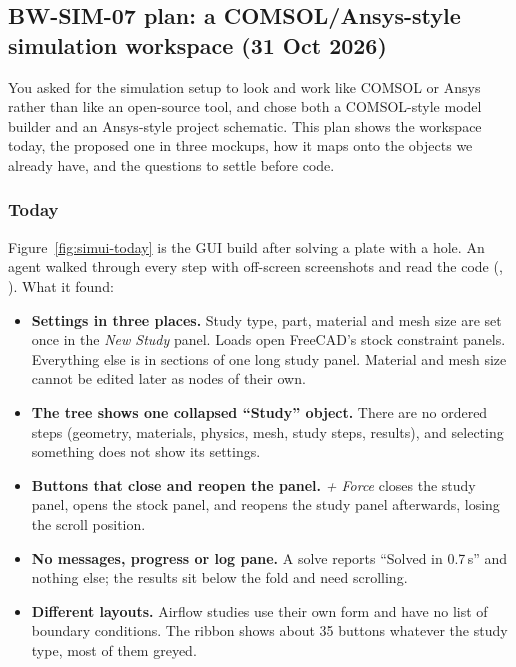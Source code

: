 \subsection{BW-SIM-07 plan: a COMSOL/Ansys-style simulation workspace (31 Oct 2026)}\label{sec:sim07-plan}

You asked for the simulation setup to look and work like COMSOL or Ansys rather than like an open-source tool, and
chose both a COMSOL-style model builder and an Ansys-style project schematic. This plan shows the workspace today,
the proposed one in three mockups, how it maps onto the objects we already have, and the questions to settle before
code.

\subsubsection*{Today}

Figure~\ref{fig:simui-today} is the GUI build after solving a plate with a hole. An agent walked through every step
with off-screen screenshots and read the code (, ).
What it found:
\begin{itemize}[nosep]
  \item \textbf{Settings in three places.} Study type, part, material and mesh size are set once in the \emph{New
        Study} panel. Loads open FreeCAD's stock constraint panels. Everything else is in sections of one long
        study panel. Material and mesh size cannot be edited later as nodes of their own.
  \item \textbf{The tree shows one collapsed ``Study'' object.} There are no ordered steps (geometry, materials,
        physics, mesh, study steps, results), and selecting something does not show its settings.
  \item \textbf{Buttons that close and reopen the panel.} \emph{+ Force} closes the study panel, opens the stock
        panel, and reopens the study panel afterwards, losing the scroll position.
  \item \textbf{No messages, progress or log pane.} A solve reports ``Solved in 0.7\,s'' and nothing else; the
        results sit below the fold and need scrolling.
  \item \textbf{Different layouts.} Airflow studies use their own form and have no list of boundary conditions.
        The ribbon shows about 35 buttons whatever the study type, most of them greyed.
\end{itemize}

